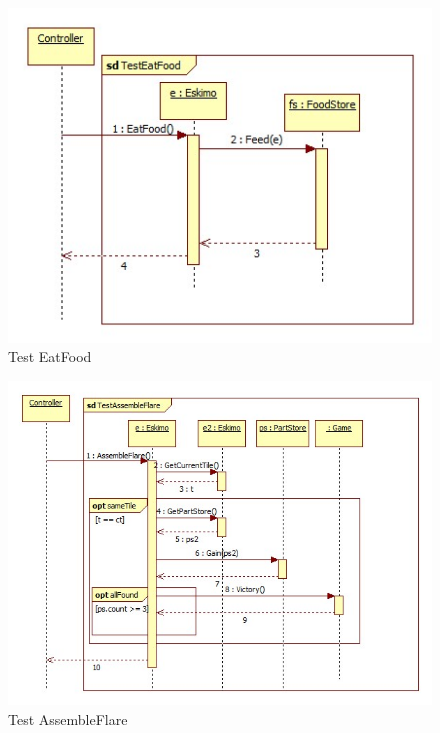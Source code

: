 \begin{figure}[h]
	\begin{center}
		\includegraphics[width=17cm]{chapters/chapter05/diagrams/Test_EatFood.jpg}
		\caption{Test EatFood}
		\label{fig:Test EatFood}
	\end{center}
\end{figure}
\begin{figure}[h]
	\begin{center}
		\includegraphics[width=17cm]{chapters/chapter05/diagrams/Test_AssembleFlare.jpg}
		\caption{Test AssembleFlare}
		\label{fig:Test AssembleFlare}
	\end{center}
\end{figure}

